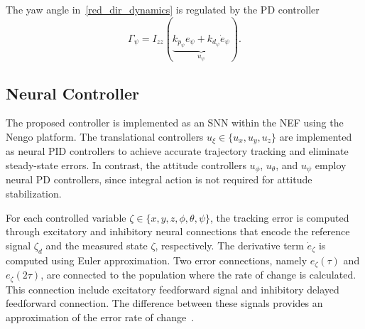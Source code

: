 \documentclass[conference]{IEEEtran}
\begin{document}
The yaw angle in~\eqref{red_dir_dynamics} is regulated by the PD controller
%
\begin{equation}
\Gamma_\psi
=
I_{zz}
(\underbrace{
k_{p_\psi}e_\psi
+k_{d_\psi}\dot{e}_\psi}_{u_\psi}
).
\end{equation}


\subsection{Neural Controller}\label{Control_SNN}

The proposed controller is implemented as an SNN within the NEF using the Nengo platform. The translational controllers $u_\xi\in\{u_x,u_y,u_z\}$ are implemented as neural PID controllers to achieve accurate trajectory tracking and eliminate steady-state errors. In contrast, the attitude controllers $u_\phi$, $u_\theta$, and $u_\psi$ employ neural PD controllers, since integral action is not required for attitude stabilization.

For each controlled variable $\zeta\in\{x,y,z,\phi,\theta,\psi\}$, the tracking error is computed through excitatory and inhibitory neural connections that encode the reference signal $\zeta_d$ and the measured state $\zeta$, respectively. The derivative term $\dot{e}_\zeta$ is computed using Euler approximation. Two error connections, namely $e_\zeta(\tau)$ and $e_\zeta(2\tau)$, are connected to the population where the rate of change is calculated. This connection include excitatory feedforward signal and inhibitory delayed feedforward connection.  The difference between these signals provides an approximation of the error rate of change~\cite{Olivares2025}.
\end{document}

